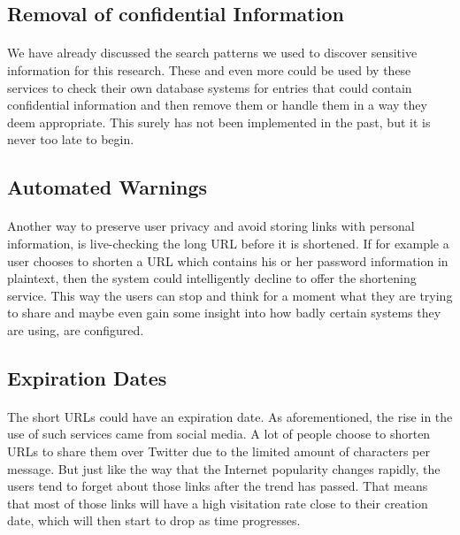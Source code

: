 \documentclass[12pt]{article}
\begin{document}
\subsection{Removal of confidential Information}

\paragraph{}
 We have already discussed the search patterns we used to discover sensitive information for this research. These and even more could be used by these services to check their own database systems for entries that could contain confidential information and then remove them or handle them in a way they deem appropriate. This surely has not been implemented in the past, but it is never too late to begin.

\subsection{Automated Warnings}

\paragraph{}
Another way to preserve user privacy and avoid storing links with personal information, is live-checking the long URL before it is shortened. If for example a user chooses to shorten a URL which contains his or her password information in plaintext, then the system could intelligently decline to offer the shortening service. This way the users can stop and think for a moment what they are trying to share and maybe even gain some insight into how badly certain systems they are using, are configured.

\subsection{Expiration Dates}

\paragraph{}
The short URLs could have an expiration date. As aforementioned, the rise in the use of such services came from social media. A lot of people choose to shorten URLs to share them over Twitter due to the limited amount of characters per message. But just like the way that the Internet popularity changes rapidly, the users tend to forget about those links after the trend has passed. That means that most of those links will have a high visitation rate close to their creation date, which will then start to drop as time progresses.
\end{document}
